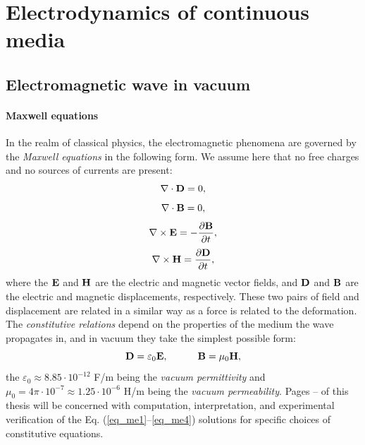 


\section{Electrodynamics of continuous media} 
\subsection{Electromagnetic wave in vacuum} %
\paragraph{Maxwell equations}  %
In the realm of classical physics, the electromagnetic phenomena are governed by the \textit{Maxwell equations} in the following form.
We assume here that no free charges and no sources of currents are present: 
\begin{equation} \nabla \cdot  \mathbf{D} = 0, \label{eq_me1}\end{equation}  
\begin{equation} \nabla \cdot  \mathbf{B} = 0, \label{eq_me2}\end{equation}  
\begin{equation} \nabla \times \mathbf{E} = -\frac{\partial \mathbf{B}} {\partial t}, \label{eq_me3}\end{equation}  
\begin{equation} \nabla \times \mathbf{H} =  \frac{\partial \mathbf{D}} {\partial t}, \label{eq_me4}\end{equation}  
where the $\mathbf{E}$ and $\mathbf{H}$ are the electric and magnetic vector fields, and $\mathbf{D}$ and $\mathbf{B}$ are the electric and magnetic displacements,
 respectively. These two pairs of field and displacement are related in a similar way as a force is related to the deformation. %
 The \textit{constitutive relations} depend on the properties of the medium the wave propagates in, and in vacuum they take the simplest possible form:
\begin{equation}		\mathbf{D} = \varepsilon_0	\mathbf{E}, \quad\quad\quad						\mathbf{B} = \mu_0			\mathbf{H},				 \label{eq_ce}\end{equation}
the $\varepsilon_0 \approx 8.85\cdot10^{-12}$ F/m being the \textit{vacuum permittivity} and $\mu_0 = 4\pi \cdot 10^{-7} \approx 1.25\cdot10^{-6}$ H/m being the \textit{vacuum permeability}. 
Pages \pageref{starttext}--\pageref{endtext} of this thesis will be concerned with computation, interpretation, and experimental verification of the Eq. (\ref{eq_me1}--\ref{eq_me4}) solutions for specific choices of constitutive equations.
